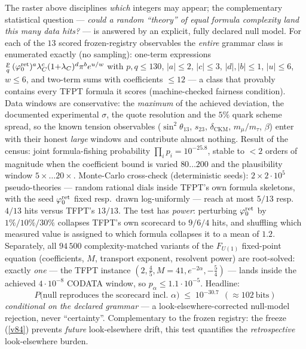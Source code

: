\begin{winbox}
The raster above disciplines \emph{which} integers may appear; the complementary statistical question ---
\emph{could a random ``theory'' of equal formula complexity land this many data hits?} --- is answered by an
explicit, fully declared null model. For each of the $13$ scored frozen-registry observables the
\emph{entire} grammar class is enumerated exactly (no sampling): one-term expressions
$\tfrac pq\,(\varphi_0^{\mathrm{ret}})^a\lambda_C^c(1{+}\lambda_C)^d\pi^b e^{u/w}$ with $p,q\le130$, $|a|\le2$, $|c|\le3$,
$|d|,|b|\le1$, $|u|\le6$, $w\le6$, and two-term sums with coefficients $\le12$ --- a class that provably
contains every TFPT formula it scores (machine-checked fairness condition). Data windows are conservative:
the \emph{maximum} of the achieved deviation, the documented experimental $\sigma$, the quote resolution and
the $5\%$ quark scheme spread, so the known tension observables ($\sin^2\theta_{13}$, $s_{23}$,
$\delta_{\mathrm{CKM}}$, $m_\mu/m_\tau$, $\beta$) enter with their honest \emph{large} windows and contribute
almost nothing. Result of the census: joint formula-fishing probability
$\prod_i p_i=10^{-25.8}$, stable to $<2$ orders of magnitude when the coefficient bound is varied
$80\dots200$ and the plausibility window $5{\times}\dots20{\times}$. Monte-Carlo cross-check
(deterministic seeds): $2\times2{\cdot}10^5$ pseudo-theories --- random rational dials inside TFPT's own
formula skeletons, with the seed $\varphi_0^{\mathrm{ret}}$ fixed resp.\ drawn log-uniformly --- reach at most $5/13$
resp.\ $4/13$ hits versus TFPT's $13/13$. The test has \emph{power}: perturbing $\varphi_0^{\mathrm{ret}}$ by
$1\%/10\%/30\%$ collapses TFPT's own scorecard to $9/6/4$ hits, and shuffling which measured value is
assigned to which formula collapses it to a mean of $1.2$. Separately, all $94\,500$ complexity-matched
variants of the $F_{U(1)}$ fixed-point equation (coefficients, $M$, transport exponent, resolvent power)
are root-solved: exactly \emph{one} --- the TFPT instance $(2,\tfrac45,M{=}41,e^{-2\alpha},-\tfrac54)$ ---
lands inside the achieved $4{\cdot}10^{-8}$ CODATA window, so $p_\alpha\le1.1{\cdot}10^{-5}$. Headline:
\[
  \boxed{\ P\bigl(\text{null reproduces the scorecard incl.\ }\alpha\bigr)
  \;\le\;10^{-30.7}\ \ (\approx102\ \text{bits})\ }
\]
\emph{conditional on the declared grammar} --- a look-elsewhere-corrected null-model rejection, never
``certainty''. Complementary to the frozen registry: the freeze (\vref{v84}) prevents \emph{future}
look-elsewhere drift, this test quantifies the \emph{retrospective} look-elsewhere burden.
\end{winbox}

